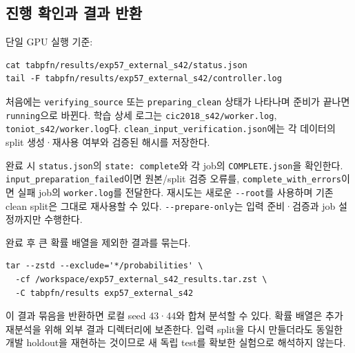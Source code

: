 \subsection{진행 확인과 결과 반환}
단일 GPU 실행 기준:


\begin{Verbatim}[breaklines=true,breakanywhere=true,fontsize=\scriptsize]
cat tabpfn/results/exp57_external_s42/status.json
tail -F tabpfn/results/exp57_external_s42/controller.log

\end{Verbatim}
처음에는 \texttt{verifyin\allowbreak{}g\_\allowbreak{}\allowbreak{}source\allowbreak{}} 또는 \texttt{preparin\allowbreak{}g\_\allowbreak{}\allowbreak{}clean} 상태가 나타나며 준비가 끝나면 \texttt{running}으로 바뀐다. 학습 상세 로그는 \texttt{cic2018\_\allowbreak{}\allowbreak{}s42/\allowbreak{}\allowbreak{}work\allowbreak{}er.\allowbreak{}log}, \texttt{toniot\_\allowbreak{}\allowbreak{}s\allowbreak{}42/\allowbreak{}\allowbreak{}worke\allowbreak{}r.\allowbreak{}log}다. \texttt{clean\_\allowbreak{}\allowbreak{}in\allowbreak{}put\_\allowbreak{}\allowbreak{}veri\allowbreak{}fication\allowbreak{}.\allowbreak{}json}에는 각 데이터의 split 생성·재사용 여부와 검증된 해시를 저장한다.

완료 시 \texttt{status.\allowbreak{}j\allowbreak{}son}의 \texttt{state: c\allowbreak{}omplete}와 각 job의 \texttt{COMPLETE\allowbreak{}.\allowbreak{}json}을 확인한다. \texttt{input\_\allowbreak{}\allowbreak{}pr\allowbreak{}eparatio\allowbreak{}n\_\allowbreak{}\allowbreak{}failed\allowbreak{}}이면 원본/\allowbreak{}split 검증 오류를, \texttt{complete\allowbreak{}\_\allowbreak{}\allowbreak{}with\_\allowbreak{}\allowbreak{}er\allowbreak{}rors}이면 실패 job의 \texttt{worker.\allowbreak{}l\allowbreak{}og}를 전달한다. 재시도는 새로운 \texttt{-\allowbreak{}-\allowbreak{}root}를 사용하며 기존 clean split은 그대로 재사용할 수 있다. \texttt{-\allowbreak{}-\allowbreak{}prepar\allowbreak{}e-\allowbreak{}only}는 입력 준비·검증과 job 설정까지만 수행한다.

완료 후 큰 확률 배열을 제외한 결과를 묶는다.


\begin{Verbatim}[breaklines=true,breakanywhere=true,fontsize=\scriptsize]
tar --zstd --exclude='*/probabilities' \
  -cf /workspace/exp57_external_s42_results.tar.zst \
  -C tabpfn/results exp57_external_s42

\end{Verbatim}
이 결과 묶음을 반환하면 로컬 seed 43·44와 합쳐 분석할 수 있다. 확률 배열은 추가 재분석을 위해 외부 결과 디렉터리에 보존한다. 입력 split을 다시 만들더라도 동일한 개발 holdout을 재현하는 것이므로 새 독립 test를 확보한 실험으로 해석하지 않는다.



